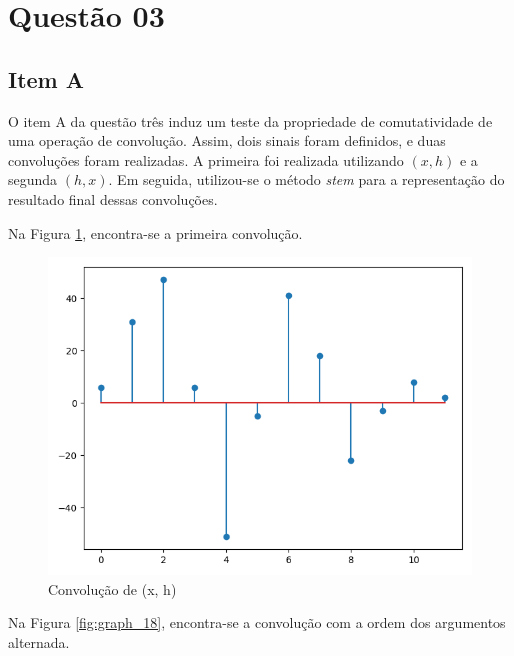 \section{Questão 03}

\subsection{Item A}
O item A da questão três induz um teste da propriedade de comutatividade de uma operação de convolução. Assim, dois sinais foram definidos, e duas convoluções foram realizadas. A primeira foi realizada utilizando $(x, h)$ e a segunda $(h, x)$. Em seguida, utilizou-se o método \textit{stem} para a representação do resultado final dessas convoluções.

Na Figura \ref{fig:graph_17}, encontra-se a primeira convolução. 

\begin{figure}[!htb]
    \centering
    \includegraphics[width=\linewidth]{Imagens/fig17.png}
    \caption{Convolução de (x, h)}
    \label{fig:graph_17}
\end{figure}

Na Figura \ref{fig:graph_18}, encontra-se a convolução com a ordem dos argumentos alternada.

